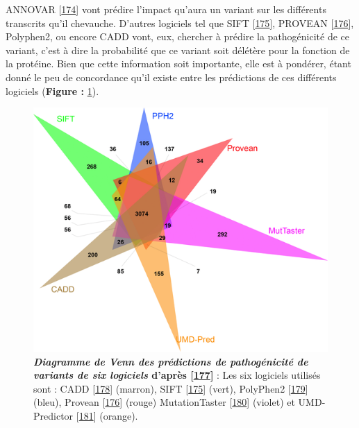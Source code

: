 \documentclass[12pt,a4paper,twoside]{ugathesis}
\theoremstyle{definition}
\theoremstyle{definition}
\theoremstyle{definition}
\theoremstyle{remark}
\begin{document}
\begin{enumerate}
\begin{enumerate}
    ANNOVAR {[}\protect\hyperlink{ref-Wang2010}{174}{]} vont prédire
    l'impact qu'aura un variant sur les différents transcrits qu'il
    chevauche. D'autres logiciels tel que SIFT
    {[}\protect\hyperlink{ref-Kumar2009}{175}{]}, PROVEAN
    {[}\protect\hyperlink{ref-Choi2012}{176}{]}, Polyphen2, ou encore
    CADD vont, eux, chercher à prédire la pathogénicité de ce variant,
    c'est à dire la probabilité que ce variant soit délétère pour la
    fonction de la protéine. Bien que cette information soit importante,
    elle est à pondérer, étant donné le peu de concordance qu'il existe
    entre les prédictions de ces différents logiciels (\textbf{Figure :}
    \ref{fig:pictvennpred}).
  \end{enumerate}
\end{enumerate}

\begin{figure}

{\centering \includegraphics[scale=.7]{figure/venn_Diag_patho_pred} 

}

\caption[Diagramme de Venn des prédictions de pathogénicité de variants de six logiciels]{\textbf{\emph{Diagramme de Venn des prédictions de
pathogénicité de variants de six logiciels} d'après
{[}\protect\hyperlink{ref-Salgado2016}{177}{]}} : Les six logiciels
utilisés sont : CADD {[}\protect\hyperlink{ref-Kircher2014}{178}{]}
(marron), SIFT {[}\protect\hyperlink{ref-Kumar2009}{175}{]} (vert),
PolyPhen2 {[}\protect\hyperlink{ref-Adzhubei2010}{179}{]} (bleu),
Provean {[}\protect\hyperlink{ref-Choi2012}{176}{]} (rouge)
MutationTaster {[}\protect\hyperlink{ref-Schwarz2010}{180}{]} (violet)
et UMD-Predictor {[}\protect\hyperlink{ref-Salgado2016a}{181}{]}
(orange).}\label{fig:pictvennpred}
\end{figure}
\end{document}
